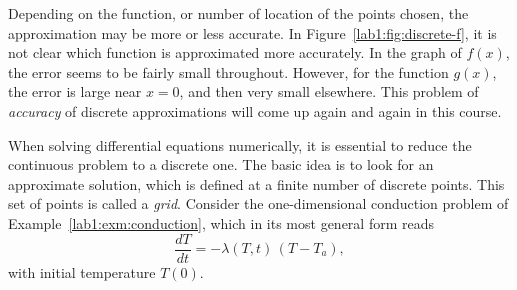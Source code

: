 \begin{example}
  Depending on the function, or number of location of the points
  chosen, the approximation may be more or less accurate.  In
  Figure~\ref{lab1:fig:discrete-f}, it is not clear which function is
  approximated more accurately.  In the graph of $f(x)$, the error
  seems to be fairly small throughout.  However, for the function
  $g(x)$, the error is large near $x=0$, and then very small
  elsewhere.  
  This problem of \emph{accuracy} of
  discrete approximations will come up again and again in this course.




\end{example}

\begin{latexonly}
\end{latexonly}
When solving differential equations numerically, it is essential to
reduce the continuous problem to a discrete one.
The basic idea is to look for an 
approximate solution, which is defined at a finite number of 
discrete points.
This set of points is called a \emph{grid}.
Consider the one-dimensional conduction problem of
Example~\ref{lab1:exm:conduction}, which in its most general form reads  
\begin{equation}
  \frac{dT}{dt} = -\lambda(T,t) \, (T-T_a),
  \label{lab1:eq:conduction}
\end{equation}
with initial temperature $T(0)$.  

